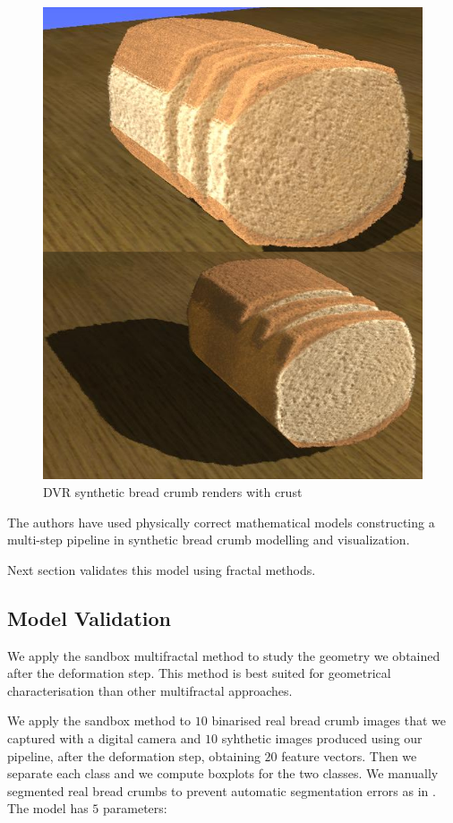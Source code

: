 \documentclass[final,5p,times]{elsarticle}
\begin{document}
{\begin{figure}[!ht]
\includegraphics[scale=0.35]{crusts.png}
\caption{DVR synthetic bread crumb renders with crust}
\label{FigRenders2}
\end{figure}

The authors have used physically correct mathematical models constructing a multi-step pipeline in synthetic bread crumb modelling and visualization. 

Next section validates this model using fractal methods.

\subsection{Model Validation}

We apply the sandbox multifractal method to study the geometry we obtained after the deformation step. This method is best suited for geometrical characterisation than other multifractal approaches.

We apply the sandbox method to $10$ binarised real bread crumb images that we captured with a digital camera and $10$ syhthetic images produced using our pipeline, after the deformation step, obtaining $20$ feature vectors. Then we separate each class and we compute boxplots for the two classes. We manually segmented real bread crumbs to prevent automatic segmentation errors as in \cite{Bosch2011}. The model has $5$ parameters:


}
\end{document}
